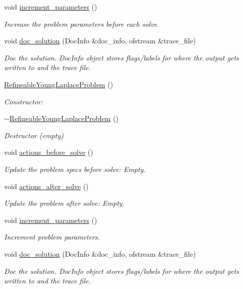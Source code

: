 \begin{DoxyCompactItemize}
void \hyperlink{classRefineableYoungLaplaceProblem_ac8da9e38012994438200b53d398ce465}{increment\+\_\+parameters} ()
\begin{DoxyCompactList}\small\item\em Increase the problem parameters before each solve. \end{DoxyCompactList}\item 
void \hyperlink{classRefineableYoungLaplaceProblem_a4ec7313c8e4015b0c2af0bbef789e70f}{doc\+\_\+solution} (Doc\+Info \&doc\+\_\+info, ofstream \&trace\+\_\+file)
\begin{DoxyCompactList}\small\item\em Doc the solution. Doc\+Info object stores flags/labels for where the output gets written to and the trace file. \end{DoxyCompactList}\item 
\hyperlink{classRefineableYoungLaplaceProblem_a78f77a299f2770a82378fcccf86a0b71}{Refineable\+Young\+Laplace\+Problem} ()
\begin{DoxyCompactList}\small\item\em Constructor\+: \end{DoxyCompactList}\item 
\hyperlink{classRefineableYoungLaplaceProblem_a24b45d5ecdd1d7dbb678e7f74777bf41}{$\sim$\+Refineable\+Young\+Laplace\+Problem} ()
\begin{DoxyCompactList}\small\item\em Destructor (empty) \end{DoxyCompactList}\item 
void \hyperlink{classRefineableYoungLaplaceProblem_af2a639c1cdfd6334c9023c6bfbe69c8a}{actions\+\_\+before\+\_\+solve} ()
\begin{DoxyCompactList}\small\item\em Update the problem specs before solve\+: Empty. \end{DoxyCompactList}\item 
void \hyperlink{classRefineableYoungLaplaceProblem_a5c472ae3361af18979085c824a47ab53}{actions\+\_\+after\+\_\+solve} ()
\begin{DoxyCompactList}\small\item\em Update the problem after solve\+: Empty. \end{DoxyCompactList}\item 
void \hyperlink{classRefineableYoungLaplaceProblem_ac8da9e38012994438200b53d398ce465}{increment\+\_\+parameters} ()
\begin{DoxyCompactList}\small\item\em Increment problem parameters. \end{DoxyCompactList}\item 
void \hyperlink{classRefineableYoungLaplaceProblem_a4ec7313c8e4015b0c2af0bbef789e70f}{doc\+\_\+solution} (Doc\+Info \&doc\+\_\+info, ofstream \&trace\+\_\+file)
\begin{DoxyCompactList}\small\item\em Doc the solution. Doc\+Info object stores flags/labels for where the output gets written to and the trace file. \end{DoxyCompactList}\end{DoxyCompactItemize}
